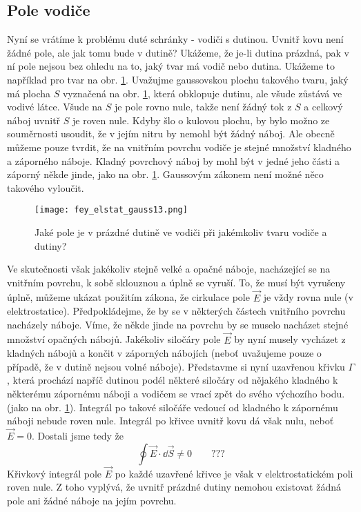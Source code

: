     \subsection{Pole vodiče}
      Nyní se vrátíme k problému duté schránky - vodiči s dutinou. Uvnitř kovu není žádné pole, ale jak tomu 
      bude v dutině? Ukážeme, že je-li dutina prázdná, pak v ní pole nejsou bez ohledu na to, jaký tvar má 
      vodič nebo dutina. Ukážeme to například pro tvar na obr. \ref{fyz:fig_fey_elstat_gauss13}. Uvažujme 
      gaussovskou plochu takového tvaru, jaký má plocha \(S\) vyznačená na obr. 
      \ref{fyz:fig_fey_elstat_gauss13}, která obklopuje dutinu, ale všude zůstává ve vodivé látce. Všude na 
      \(S\) je pole rovno nule, takže není žádný tok z \(S\) a celkový náboj uvnitř \(S\) je roven nule. 
      Kdyby šlo o kulovou plochu, by bylo možno ze souměrnosti usoudit, že v jejím nitru by nemohl být žádný 
      náboj. Ale obecně můžeme pouze tvrdit, že na vnitřním povrchu vodiče je stejné množství kladného a 
      záporného náboje. Kladný povrchový náboj by mohl být v jedné jeho části a záporný někde jinde, jako na 
      obr. \ref{fyz:fig_fey_elstat_gauss13}. Gaussovým zákonem není možné něco takového vyloučit.
      \begin{figure}[ht!] %
        \centering
        \texttt{[image: fey\_elstat\_gauss13.png]}
        \caption{Jaké pole je v prázdné dutině ve vodiči při jakémkoliv tvaru vodiče a dutiny?}
        \label{fyz:fig_fey_elstat_gauss13}
      \end{figure} 
      
      Ve skutečnosti však jakékoliv stejně velké a opačné náboje, nacházející se na vnitřním povrchu, k sobě 
      sklouznou a úplně se vyruší. To, že musí být vyrušeny úplně, můžeme ukázat použitím zákona, že 
      cirkulace pole \(\vec{E}\) je vždy rovna nule (v elektrostatice). Předpokládejme, že by se v některých 
      částech vnitřního povrchu nacházely náboje. Víme, že někde jinde na povrchu by se muselo nacházet 
      stejné množství opačných nábojů. Jakékoliv siločáry pole \(\vec{E}\) by nyní musely vycházet z kladných 
      nábojů a končit v záporných nábojích (neboť uvažujeme pouze o případě, že v dutině nejsou volné 
      náboje). Představme si nyní uzavřenou křivku \(\Gamma\), která prochází napříč dutinou podél některé 
      siločáry od nějakého kladného k některému zápornému náboji a vodičem se vrací zpět do svého výchozího 
      bodu. (jako na obr. \ref{fyz:fig_fey_elstat_gauss13}). Integrál po takové siločáře vedoucí od kladného 
      k zápornému náboji nebude roven nule. Integrál po křivce uvnitř kovu dá však nulu, neboť \(\vec{E}=0\). 
      Dostali jsme tedy že
      \begin{equation}\label{fyz:eq_fey_elstat_gauss08}
        \oint \vec{E}\cdot\dd{\vec{S}} \neq 0  \qquad ???
      \end{equation}
      Křivkový integrál pole \(\vec{E}\) po každé uzavřené křivce je však v elektrostatickém poli roven nule. 
      Z toho vyplývá, že uvnitř prázdné dutiny nemohou existovat žádná pole ani žádné náboje na jejím povrchu.
      
